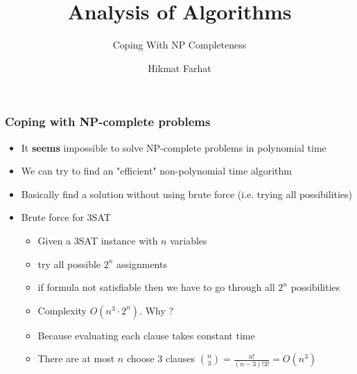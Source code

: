 \documentclass{beamer}
\title{ Analysis of Algorithms}
\subtitle{Coping With NP Completeness}
\author{Hikmat Farhat}
\begin{document}
\frame{\titlepage}

\begin{frame}
  \frametitle{Coping with NP-complete problems}
  \begin{itemize}
  \item It \textbf{seems} impossible to solve NP-complete problems in polynomial time
  \item We can try to find an "efficient" non-polynomial time algorithm
  \item Basically find a solution without using brute force (i.e. trying all possibilities)
  \item Brute force for  3SAT
    \begin{itemize}
    \item Given a 3SAT instance with $n$ variables
    \item try all possible $2^n$ assignments
    \item if formula not satisfiable then we have to go through all $2^n$ possibilities
    \item Complexity $O(n^3\cdot 2^n)$. Why ?
     \item Because evaluating each clause takes constant time
    \item There are at most $n$ choose 3 clauses $\binom{n}{3}=\frac{n!}{(n-3)!3!}=O(n^3)$
    \end{itemize}
  \end{itemize}
\end{frame}
\end{document}
